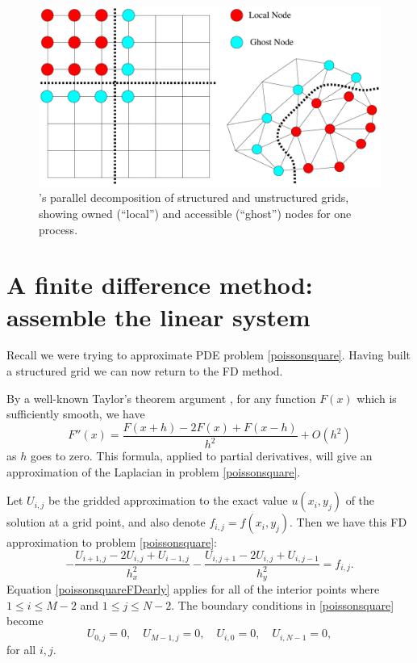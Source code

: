 \begin{figure}
\includegraphics[width=\textwidth]{petscghostvalues}
\caption{\PETSc's parallel decomposition of structured and unstructured grids, showing owned (``local'') and accessible (``ghost'') nodes for one process.}
\label{fig:petscghostvalues}
\end{figure}


\section{A finite difference method: assemble the linear system}

Recall we were trying to approximate PDE problem \eqref{poissonsquare}.  Having built a structured grid we can now return to the FD method.

By a well-known Taylor's theorem argument \citep{MortonMayers}, for any function $F(x)$ which is sufficiently smooth, we have
    $$F''(x) = \frac{F(x+h) - 2 F(x) + F(x-h)}{h^2} + O(h^2)$$
as $h$ goes to zero.  This formula, applied to partial derivatives, will give an approximation of the Laplacian in problem \eqref{poissonsquare}.

Let $U_{i,j}$ be the gridded approximation to the exact value $u(x_i,y_j)$ of the solution at a grid point,  and also denote $f_{i,j} = f(x_i,y_j)$.  Then we have this FD approximation to problem \eqref{poissonsquare}:
\begin{equation}
- \frac{U_{i+1,j} - 2 U_{i,j} + U_{i-1,j}}{h_x^2} - \frac{U_{i,j+1} - 2 U_{i,j} + U_{i,j-1}}{h_y^2} = f_{i,j}. \label{poissonsquareFDearly}
\end{equation}
Equation \eqref{poissonsquareFDearly} applies for all of the interior points where $1 \le i \le M-2$ and $1 \le j \le N-2$.  The boundary conditions in \eqref{poissonsquare} become
\begin{equation}
U_{0,j} = 0, \quad U_{M-1,j} = 0, \quad U_{i,0} = 0, \quad U_{i,N-1} = 0, \label{poissonsquareFDbcs}
\end{equation}
for all $i,j$.


